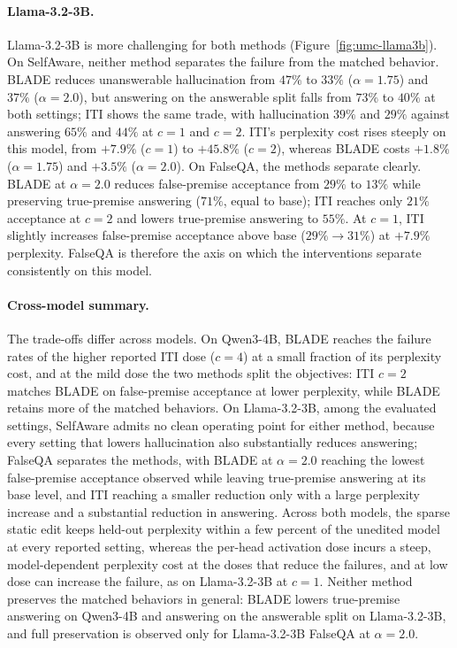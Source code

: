\paragraph{Llama-3.2-3B.}
Llama-3.2-3B is more challenging for both methods (Figure~\ref{fig:umc-llama3b}). On SelfAware, neither
method separates the failure from the matched behavior. BLADE reduces unanswerable hallucination from
$47\%$ to $33\%$ ($\alpha{=}1.75$) and $37\%$ ($\alpha{=}2.0$), but answering on the answerable split
falls from $73\%$ to $40\%$ at both settings; ITI shows the same trade, with hallucination $39\%$ and
$29\%$ against answering $65\%$ and $44\%$ at $c{=}1$ and $c{=}2$. ITI's perplexity cost rises steeply
on this model, from $+7.9\%$ ($c{=}1$) to $+45.8\%$ ($c{=}2$), whereas BLADE costs $+1.8\%$
($\alpha{=}1.75$) and $+3.5\%$ ($\alpha{=}2.0$). On FalseQA, the methods separate clearly. BLADE at
$\alpha{=}2.0$ reduces false-premise acceptance from $29\%$ to $13\%$ while preserving true-premise
answering ($71\%$, equal to base); ITI reaches only $21\%$ acceptance at $c{=}2$ and lowers true-premise
answering to $55\%$. At $c{=}1$, ITI slightly increases false-premise acceptance above base
($29\%\to31\%$) at $+7.9\%$ perplexity. FalseQA is therefore the axis on which the interventions separate
consistently on this model.

\paragraph{Cross-model summary.}
The trade-offs differ across models. On Qwen3-4B, BLADE reaches the failure rates of the higher reported
ITI dose ($c{=}4$) at a small fraction of its perplexity cost, and at the mild dose the two methods split
the objectives: ITI $c{=}2$ matches BLADE on false-premise acceptance at lower perplexity, while BLADE
retains more of the matched behaviors. On Llama-3.2-3B, among the evaluated settings, SelfAware admits no
clean operating point for either method, because every setting that lowers hallucination also
substantially reduces answering; FalseQA separates the methods, with BLADE at $\alpha{=}2.0$ reaching the
lowest false-premise acceptance observed while leaving true-premise answering at its base level, and ITI
reaching a smaller reduction only with a large perplexity increase and a substantial reduction in
answering. Across both models, the sparse static edit keeps held-out perplexity within a few percent of
the unedited model at every reported setting, whereas the per-head activation dose incurs a steep,
model-dependent perplexity cost at the doses that reduce the failures, and at low dose can increase the
failure, as on Llama-3.2-3B at $c{=}1$. Neither method preserves the matched behaviors in general: BLADE
lowers true-premise answering on Qwen3-4B and answering on the answerable split on Llama-3.2-3B, and full
preservation is observed only for Llama-3.2-3B FalseQA at $\alpha{=}2.0$.
